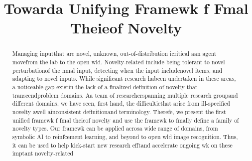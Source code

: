 \documentclass[letterpaper]{article} %
\begin{document}
\title{Towarda Unifying Framewk f Fmal Theieof Novelty}



\maketitle





\begin{abstract}
Managing inputthat are novel, unknown,  out-of-distribution icritical aan agent movefrom the lab to the open wld. Novelty-related include being tolerant to novel perturbationof the nmal input, detecting when the input includenovel items, and adapting to novel inputs.  While significant research habeen undertaken in these areas, a noticeable gap existin the lack of a fmalized definition of novelty that transcendproblem domains. Aa team of researcherspanning multiple research groupand different domains,  we have seen, first hand, the difficultiethat arise from ill-specified novelty  awell ainconsistent definitionand terminology. Therefe, we present the first unified framewk f fmal theieof novelty and use the framewk to fmally define a family of novelty types. Our framewk can be applied acrosa wide range of domains, from symbolic AI to reinfcement learning, and beyond to open wld image recognition. Thus, it can be used to help kick-start new research efftand accelerate ongoing wk on these imptant novelty-related 
\end{abstract}
\end{document}
